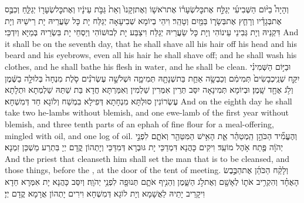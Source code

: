 {וְהָיָה֩ בַיּ֨וֹם הַשְּׁבִיעִ֜י יְגַלַּ֣ח אֶת\maqqaf כׇּל\maqqaf שְׂעָר֗וֹ אֶת\maqqaf רֹאשׁ֤וֹ וְאֶת\maqqaf זְקָנוֹ֙ וְאֵת֙ גַּבֹּ֣ת עֵינָ֔יו וְאֶת\maqqaf כׇּל\maqqaf שְׂעָר֖וֹ יְגַלֵּ֑חַ וְכִבֶּ֣ס אֶת\maqqaf בְּגָדָ֗יו וְרָחַ֧ץ אֶת\maqqaf בְּשָׂר֛וֹ בַּמַּ֖יִם וְטָהֵֽר׃}
{וִיהֵי בְיוֹמָא שְׁבִיעָאָה יְגַלַּח יָת כָּל שַׂעֲרֵיהּ יָת רֵישֵׁיהּ וְיָת דִּקְנֵיהּ וְיָת גְּבִינֵי עֵינוֹהִי וְיָת כָּל שַׂעֲרֵיהּ יְגַלַּח וִיצַבַּע יָת לְבוּשׁוֹהִי וְיַסְחֵי יָת בִּשְׂרֵיהּ בְּמַיָּא וְיִדְכֵּי׃}
{And it shall be on the seventh day, that he shall shave all his hair off his head and his beard and his eyebrows, even all his hair he shall shave off; and he shall wash his clothes, and he shall bathe his flesh in water, and he shall be clean.}{}
{וּבַיּ֣וֹם הַשְּׁמִינִ֗י יִקַּ֤ח שְׁנֵֽי\maqqaf כְבָשִׂים֙ תְּמִימִ֔ם וְכַבְשָׂ֥ה אַחַ֛ת בַּת\maqqaf שְׁנָתָ֖הּ תְּמִימָ֑ה וּשְׁלֹשָׁ֣ה עֶשְׂרֹנִ֗ים סֹ֤לֶת מִנְחָה֙ בְּלוּלָ֣ה בַשֶּׁ֔מֶן וְלֹ֥ג אֶחָ֖ד שָֽׁמֶן׃}
{וּבְיוֹמָא תְּמִינָאָה יִסַּב תְּרֵין אִמְּרִין שַׁלְמִין וְאִמַּרְתָּא חֲדָא בַּת שַׁתַּהּ שַׁלְמְתָא וּתְלָתָא עֶשְׂרוֹנִין סוּלְתָּא מִנְחָתָא דְּפִילָא בִמְשַׁח וְלוֹגָא חַד דְּמִשְׁחָא׃}
{And on the eighth day he shall take two he-lambs without blemish, and one ewe-lamb of the first year without blemish, and three tenth parts of an ephah of fine flour for a meal-offering, mingled with oil, and one log of oil.}{}
{וְהֶעֱמִ֞יד הַכֹּהֵ֣ן הַֽמְטַהֵ֗ר אֵ֛ת הָאִ֥ישׁ הַמִּטַּהֵ֖ר וְאֹתָ֑ם לִפְנֵ֣י יְהֹוָ֔ה פֶּ֖תַח אֹ֥הֶל מוֹעֵֽד׃}
{וִיקִים כָּהֲנָא דִּמְדַכֵּי יָת גּוּבְרָא דְּמִדַּכֵּי וְיָתְהוֹן קֳדָם יְיָ בִּתְרַע מַשְׁכַּן זִמְנָא׃}
{And the priest that cleanseth him shall set the man that is to be cleansed, and those things, before the \lord, at the door of the tent of meeting.}{}
{וְלָקַ֨ח הַכֹּהֵ֜ן אֶת\maqqaf הַכֶּ֣בֶשׂ הָאֶחָ֗ד וְהִקְרִ֥יב אֹת֛וֹ לְאָשָׁ֖ם וְאֶת\maqqaf לֹ֣ג הַשָּׁ֑מֶן וְהֵנִ֥יף אֹתָ֛ם תְּנוּפָ֖ה לִפְנֵ֥י יְהֹוָֽה׃}
{וְיִסַּב כָּהֲנָא יָת אִמְּרָא חַדָא וִיקָרֵיב יָתֵיהּ לַאֲשָׁמָא וְיָת לוֹגָא דְּמִשְׁחָא וִירִים יָתְהוֹן אֲרָמָא קֳדָם יְיָ׃}
